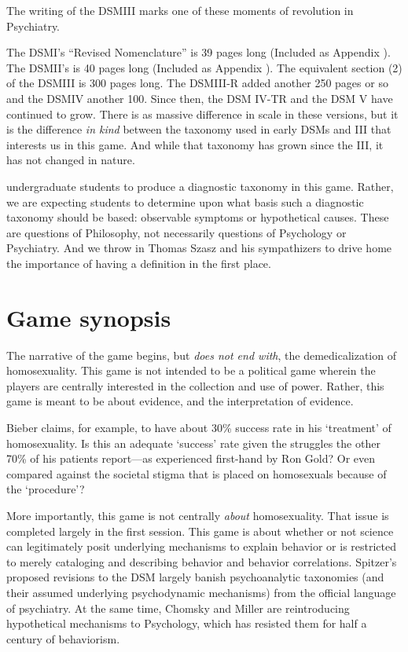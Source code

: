 \begin{refsection}
The writing of the DSMIII marks one of these moments of revolution in Psychiatry. 

The DSMI’s “Revised Nomenclature” is 39 pages long (Included as Appendix ). The DSMII’s is 40 pages long (Included as Appendix ). The equivalent section (2) of the DSMIII is 300 pages long. The DSMIII-R added another 250 pages or so and the DSMIV another 100. Since then, the DSM IV-TR and the DSM V have continued to grow. There is as massive difference in scale in these versions, but it is the difference \emph{in kind} between the taxonomy used in early DSMs and III that interests us in this game. And while that taxonomy has grown since the III, it has not changed in nature.

 undergraduate students to produce a diagnostic taxonomy in this game. Rather, we are expecting students to determine upon what basis such a diagnostic taxonomy should be based: observable symptoms or hypothetical causes. These are questions of Philosophy, not necessarily questions of Psychology or Psychiatry. And we throw in Thomas Szasz and his sympathizers to drive home the importance of having a definition in the first place.

\section{Game synopsis}
\label{gamesynopsis}

The narrative of the game begins, but \emph{does not end with}, the demedicalization of homosexuality. This game is not intended to be a political game wherein the players are centrally interested in the collection and use of power. Rather, this game is meant to be about evidence, and the interpretation of evidence.

Bieber claims, for example, to have about 30\% success rate in his ‘treatment’ of homosexuality. Is this an adequate ‘success’ rate given the struggles the other 70\% of his patients report---as experienced first-hand by Ron Gold? Or even compared against the societal stigma that is placed on homosexuals because of the ‘procedure’?

More importantly, this game is not centrally \emph{about} homosexuality. That issue is completed largely in the first session. This game is about whether or not science can legitimately posit underlying mechanisms to explain behavior or is restricted to merely cataloging and describing behavior and behavior correlations. Spitzer’s proposed revisions to the DSM largely banish psychoanalytic taxonomies (and their assumed underlying psychodynamic mechanisms) from the official language of psychiatry. At the same time, Chomsky and Miller are reintroducing hypothetical mechanisms to Psychology, which has resisted them for half a century of behaviorism.


\end{refsection}
